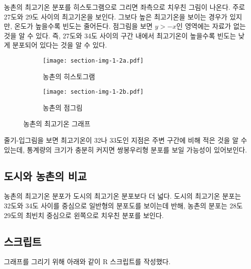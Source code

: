 농촌의 최고기온 분포를 히스토그램으로 그리면 좌측으로 치우친 그림이 나온다.
주로 27도와 29도 사이의 최고기온을 보인다. 그보다 높은 최고기온을 보이는 경우가 있지만,
온도가 높을수록 빈도는 줄어든다. 점그림을 보면 $y > -x$인 영역에는 자료가 없는
것을 알 수 있다. 즉, 27도와 34도 사이의 구간 내에서 최고기온이 높을수록 빈도는 낮게
분포되어 있다는 것을 알 수 있다.

\begin{figure}[!hb]
  \begin{subfigure}{0.5\textwidth}
    \centering
    \texttt{[image: section-img-1-2a.pdf]}
    \caption{농촌의 히스토그램}
  \end{subfigure}
  \begin{subfigure}{0.5\textwidth}
    \centering
    \texttt{[image: section-img-1-2b.pdf]}
    \caption{농촌의 점그림}
  \end{subfigure}
  \caption{농촌의 최고기온 그래프}
\end{figure}


줄기-입그림을 보면 최고기온이 32나 33도인 지점은 주변 구간에 비해 적은 것을 알 수
있는데, 통계량의 크기가 충분히 커지면 쌍봉우리형 분포를 보일 가능성이 있어보인다.

\subsection{도시와 농촌의 비교}

농촌의 최고기온 분포가 도시의 최고기온 분포보다 더 넓다. 도시의 최고기온 분포는
32도와 34도 사이를 중심으로 일반형의 분포도를 보이는데 반해, 농촌의 분포는
28도 29도의 최빈치 중심으로 왼쪽으로 치우친 분포를 보인다.

\subsection{스크립트}
그래프를 그리기 위해 아래와 같이 R 스크립트를 작성했다.


